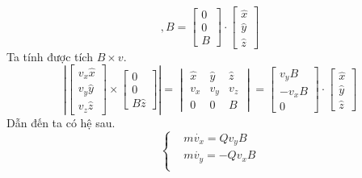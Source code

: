 \begin{enumerate}
\[, B =
\begin{bmatrix}
0\\
0\\
B
\end{bmatrix}
\cdot
\begin{bmatrix}
\hat{x}\\
\hat{y}\\
\hat{z}
\end{bmatrix}
\]
Ta tính được tích $B \times v$.
\[
\left|
\begin{bmatrix}
v_x\hat{x}\\
v_y\hat{y}\\
v_z\hat{z}
\end{bmatrix}
\times
\begin{bmatrix}
0\\
0\\
B\hat{z}
\end{bmatrix}
\right|
=
\begin{vmatrix}
\hat{x} & \hat{y} &\hat{z} \\
v_x & v_y & v_z \\
0 & 0 & B
\end{vmatrix}
=
\begin{bmatrix}
v_yB \\
-v_xB \\
0
\end{bmatrix}
\cdot
\begin{bmatrix}
\hat{x}\\
\hat{y}\\
\hat{z}
\end{bmatrix}
\]
Dẫn đến ta có hệ sau.
\[
\begin{cases}
&m\dot{v_x} = Qv_yB \\[6pt]

&m\dot{v_y} = -Qv_xB \\[6pt]


\end{cases}\]
\end{enumerate}

